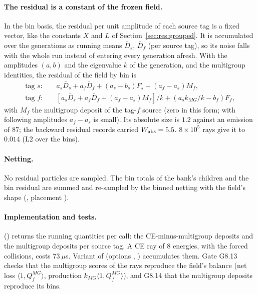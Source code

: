 \paragraph{The residual is a constant of the frozen field.} In the bin basis, the residual per unit
amplitude of each source tag is a fixed vector, like the constants $X$ and $L$ of
Section~\ref{sec:res:grouped}. It is accumulated over the generations as running means $\bar D_s$,
$\bar D_f$ (per source tag), so its noise falls with the whole run instead of entering every
generation afresh. With the amplitudes $(a,b)$ and the eigenvalue $k$ of the generation, and the
multigroup identities, the residual of the field by bin is
\begin{align}
\text{tag }s:&\quad a_s\bar D_s+a_f\bar D_f+(a_s-b_s)F_s+(a_f-a_s)M_f,\nonumber\\
\text{tag }f:&\quad \left[a_s\bar D_s+a_f\bar D_f+(a_f-a_s)M_f\right]/k+(a_sk_{MG}/k-b_f)F_f,
\end{align}
with $M_f$ the multigroup deposit of the tag-$f$ source (zero in this form; with following amplitudes
$a_f-a_s$ is small). Its absolute size is $1.2$ against an emission of $87$; the backward residual
records carried $W_{\mathrm{abs}}=5.5$. $8\times10^5$ rays give it to $0.014$ (L2 over the bins).

\paragraph{Netting.} No residual particles are sampled. The bin totals of the bank's children and the
bin residual are summed and re-sampled by the binned netting with the field's shape
(, placement ).

\paragraph{Implementation and tests.} 
() returns the running quantities per call: the
CE-minus-multigroup deposits and the multigroup deposits per source tag. A CE ray of 8 energies,
with the forced collisions, costs $73~\mu$s. Variant  of  (options
, ) accumulates them. Gate G8.13 checks that the
multigroup scores of the rays reproduce the field's balance (net loss $\langle1,Q^{MG}_f\rangle$,
production $k_{MG}\langle1,Q^{MG}_f\rangle$), and G8.14 that the multigroup deposits reproduce its
bins.

